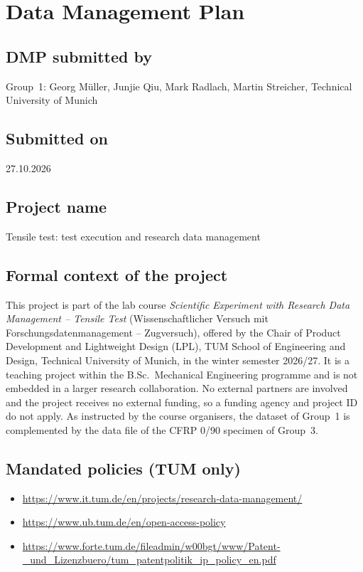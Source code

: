 \documentclass[11pt,a4paper]{article}
\begin{document}
\appendix
\section{Data Management Plan}

\subsection*{DMP submitted by}
Group~1: Georg Müller, Junjie Qiu, Mark Radlach, Martin Streicher,
Technical University of Munich

\subsection*{Submitted on}
27.10.2026

\subsection*{Project name}
Tensile test: test execution and research data management

\subsection*{Formal context of the project}
This project is part of the lab course \emph{Scientific Experiment with
Research Data Management -- Tensile Test} (Wissenschaftlicher Versuch mit
Forschungsdatenmanagement -- Zugversuch), offered by the Chair of Product
Development and Lightweight Design (LPL), TUM School of Engineering and
Design, Technical University of Munich, in the winter semester 2026/27. It
is a teaching project within the B.Sc.\ Mechanical Engineering programme and
is not embedded in a larger research collaboration. No external partners are
involved and the project receives no external funding, so a funding
agency and project ID do not apply. As instructed by the course organisers,
the dataset of Group~1 is complemented by the data file of the CFRP
0\textdegree/90\textdegree{} specimen of Group~3.

\subsection*{Mandated policies (TUM only)}
\begin{itemize}[nosep]
 \item \url{https://www.it.tum.de/en/projects/research-data-management/}
 \item \url{https://www.ub.tum.de/en/open-access-policy}
 \item \url{https://www.forte.tum.de/fileadmin/w00bgt/www/Patent-_und_Lizenzbuero/tum_patentpolitik_ip_policy_en.pdf}
\end{itemize}
\end{document}
